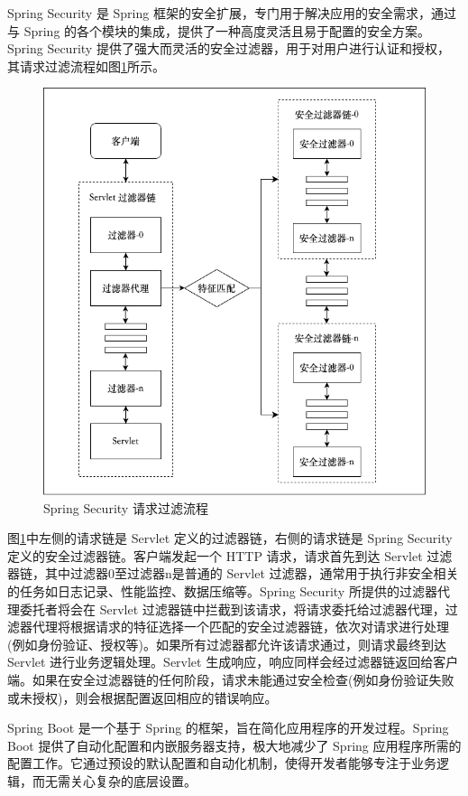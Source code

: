 Spring Security 是 Spring 框架的安全扩展，专门用于解决应用的安全需求，通过与 Spring 的各个模块的集成，提供了一种高度灵活且易于配置的安全方案。Spring Security 提供了强大而灵活的安全过滤器，用于对用户进行认证和授权，其请求过滤流程如图\ref{fig:Spring-Security}所示。

\begin{figure}[H]
    \centering
    \includegraphics[width=0.8\linewidth]{../design/Spring-Security.png}
    \caption{Spring Security 请求过滤流程}
    \label{fig:Spring-Security}
\end{figure}

图\ref{fig:Spring-Security}中左侧的请求链是 Servlet 定义的过滤器链，右侧的请求链是 Spring Security 定义的安全过滤器链。客户端发起一个 HTTP 请求，请求首先到达 Servlet 过滤器链，其中过滤器0至过滤器n是普通的 Servlet 过滤器，通常用于执行非安全相关的任务如日志记录、性能监控、数据压缩等。Spring Security 所提供的过滤器代理委托者将会在 Servlet 过滤器链中拦截到该请求，将请求委托给过滤器代理，过滤器代理将根据请求的特征选择一个匹配的安全过滤器链，依次对请求进行处理(例如身份验证、授权等)。如果所有过滤器都允许该请求通过，则请求最终到达 Servlet 进行业务逻辑处理。Servlet 生成响应，响应同样会经过滤器链返回给客户端。如果在安全过滤器链的任何阶段，请求未能通过安全检查(例如身份验证失败或未授权)，则会根据配置返回相应的错误响应\cite{Spring-Security-架构设计}。

Spring Boot 是一个基于 Spring 的框架，旨在简化应用程序的开发过程。Spring Boot 提供了自动化配置和内嵌服务器支持，极大地减少了 Spring 应用程序所需的配置工作。它通过预设的默认配置和自动化机制，使得开发者能够专注于业务逻辑，而无需关心复杂的底层设置\cite{Spring-Boot-概述}。

